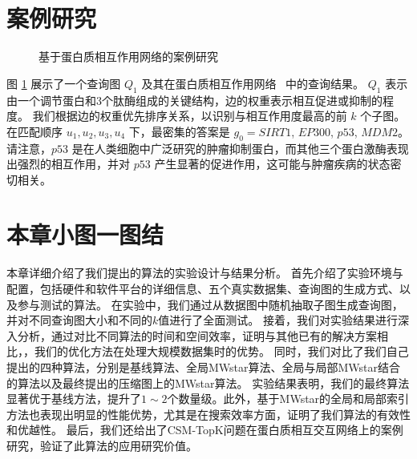 \section{案例研究}
\begin{figure}[h!]
    \centering
    \caption{基于蛋白质相互作用网络的案例研究}
    \label{fig:human-caseStudy}
    \end{figure}    
图 \ref{fig:human-caseStudy} 展示了一个查询图 $Q_1$ 及其在蛋白质相互作用网络~\cite{dat-protein} 中的查询结果。
    $Q_1$ 表示由一个调节蛋白和3个肽酶组成的关键结构，边的权重表示相互促进或抑制的程度。
    我们根据边的权重优先排序关系，以识别与相互作用度最高的前 $k$ 个子图。
    在匹配顺序 ${u_1, u_2, u_3, u_4}$ 下，最密集的答案是 $g_0=${$SIRT1$, $EP300$, $p53$, $MDM2$}。
    请注意，$p53$ 是在人类细胞中广泛研究的肿瘤抑制蛋白，而其他三个蛋白激酶表现出强烈的相互作用，并对 $p53$ 产生显著的促进作用，这可能与肿瘤疾病的状态密切相关。
\section{本章小图一图结}
本章详细介绍了我们提出的算法的实验设计与结果分析。
首先介绍了实验环境与配置，包括硬件和软件平台的详细信息、五个真实数据集、查询图的生成方式、以及参与测试的算法。
在实验中，我们通过从数据图中随机抽取子图生成查询图，并对不同查询图大小和不同的$k$值进行了全面测试。
接着，我们对实验结果进行深入分析，通过对比不同算法的时间和空间效率，证明与其他已有的解决方案相比，，我们的优化方法在处理大规模数据集时的优势。
同时，我们对比了我们自己提出的四种算法，分别是基线算法、全局MWstar算法、全局与局部MWstar结合的算法以及最终提出的压缩图上的MWstar算法。
实验结果表明，我们的最终算法显著优于基线方法，提升了$1\sim2$个数量级。此外，基于MWstar的全局和局部索引方法也表现出明显的性能优势，尤其是在搜索效率方面，证明了我们算法的有效性和优越性。
最后，我们还给出了CSM-TopK问题在蛋白质相互交互网络上的案例研究，验证了此算法的应用研究价值。
